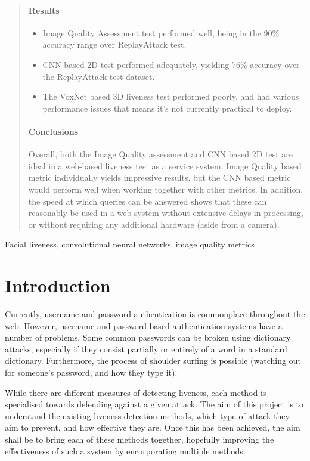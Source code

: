 \documentclass[10pt,a4paper]{article}
\begin{document}
\begin{abstract}
\paragraph{Results}
    \begin{itemize}
        \item Image Quality Assessment test performed well, being in the 90\% accuracy range over ReplayAttack test.
        \item CNN based 2D test performed adequately, yielding 76\% accuracy over the ReplayAttack test dataset.
        \item The VoxNet based 3D liveness test performed poorly, and had various performance issues that means it's not currently practical to deploy.
    \end{itemize}
\paragraph{Conclusions}
    Overall, both the Image Quality assessment and CNN based 2D test are ideal in a web-based liveness test as a service system. Image Quality based metric individually yields
    impressive results, but the CNN based metric would perform well when working together with other metrics. In addition, the speed at which queries can be answered shows 
    that these can reasonably be used in a web system without extensive delays in processing, or without requiring any additional hardware (aside from a camera).
\end{abstract}

\begin{keywords}
Facial liveness, convolutional neural networks, image quality metrics
\end{keywords}

\section{Introduction}
    Currently, username and password authentication is commonplace throughout the web. However, username and password
    based authentication systems have a number of problems. Some common passwords can be broken using dictionary attacks,
    especially if they consist partially or entirely of a word in a standard dictionary. Furthermore, the process of shoulder surfing is possible (watching out
    for someone's password, and how they type it).

   While there are different measures of detecting liveness, each method is specialised towards defending against a given attack. The aim of this project is to understand
   the existing liveness detection methods, which type of attack they aim to prevent, and how effective they are. Once this has been achieved, the aim shall be to bring
   each of these methods together, hopefully improving the effectiveness of such a system by encorporating multiple methods.
\end{document}
